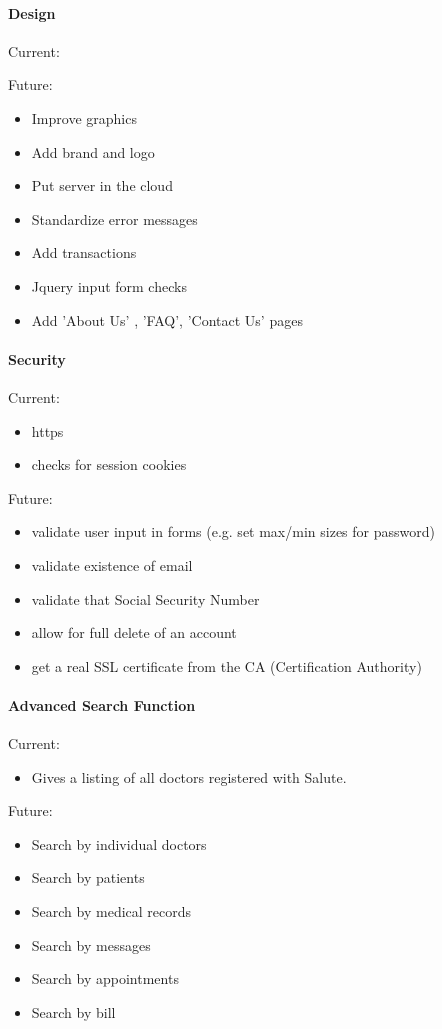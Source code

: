 \documentclass[12pt]{report}
\begin{document}
\paragraph{Design}
Current:
\begin{itemize}
\end{itemize}

Future: 
\begin{itemize}
\item Improve graphics
\item Add brand and logo
\item Put server in the cloud
\item Standardize error messages
\item Add transactions
\item Jquery input form checks
\item Add 'About Us' , 'FAQ', 'Contact Us' pages 
\end{itemize}

\paragraph{Security}
Current:
\begin{itemize}
\item https
\item checks for session cookies
\end{itemize}
Future: 
\begin{itemize}
\item validate user input in forms (e.g. set max/min sizes for password)
\item validate existence of email
\item validate that Social Security Number
\item allow for full delete of an account
\item get a real SSL certificate from the CA (Certification Authority)
\end{itemize}

\paragraph{Advanced Search Function}
Current:
\begin{itemize}
\item Gives a listing of all doctors registered with Salute.
\end{itemize}

Future: 
\begin{itemize}
\item Search by individual doctors 
\item Search by patients
\item Search by medical records 
\item Search by messages
\item Search by appointments
\item Search by bill
\end{itemize}
\end{document}
